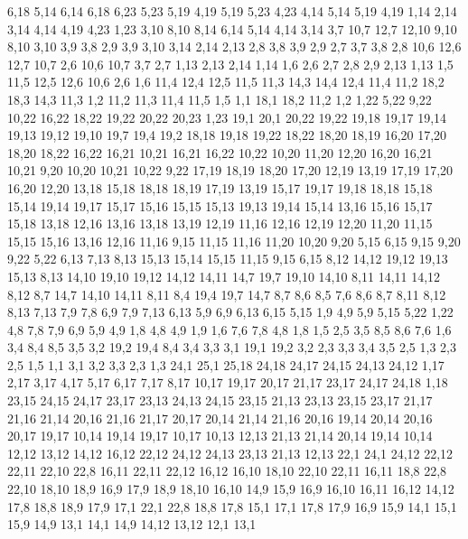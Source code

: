 6,18
%
5,14
6,14
6,18
6,23
5,23
5,19
%
4,19
5,19
5,23
4,23
%
4,14
5,14
5,19
4,19
%
1,14
2,14
3,14
4,14
4,19
4,23
1,23
%
3,10
8,10
8,14
6,14
5,14
4,14
3,14
%
3,7
10,7
12,7
12,10
9,10
8,10
3,10
3,9
3,8
%
2,9
3,9
3,10
3,14
2,14
2,13
%
2,8
3,8
3,9
2,9
%
2,7
3,7
3,8
2,8
%
10,6
12,6
12,7
10,7
%
2,6
10,6
10,7
3,7
2,7
%
1,13
2,13
2,14
1,14
%
1,6
2,6
2,7
2,8
2,9
2,13
1,13
%
1,5
11,5
12,5
12,6
10,6
2,6
1,6
%
11,4
12,4
12,5
11,5
%
11,3
14,3
14,4
12,4
11,4
%
11,2
18,2
18,3
14,3
11,3
%
1,2
11,2
11,3
11,4
11,5
1,5
%
1,1
18,1
18,2
11,2
1,2
1,22
5,22
9,22
10,22
16,22
18,22
19,22
20,22
20,23
1,23
%
19,1
20,1
20,22
19,22
19,18
19,17
19,14
19,13
19,12
19,10
19,7
19,4
19,2
%
18,18
19,18
19,22
18,22
18,20
18,19
%
16,20
17,20
18,20
18,22
16,22
16,21
%
10,21
16,21
16,22
10,22
%
10,20
11,20
12,20
16,20
16,21
10,21
%
9,20
10,20
10,21
10,22
9,22
%
17,19
18,19
18,20
17,20
%
12,19
13,19
17,19
17,20
16,20
12,20
%
13,18
15,18
18,18
18,19
17,19
13,19
%
15,17
19,17
19,18
18,18
15,18
%
15,14
19,14
19,17
15,17
15,16
15,15
%
15,13
19,13
19,14
15,14
%
13,16
15,16
15,17
15,18
13,18
%
12,16
13,16
13,18
13,19
12,19
%
11,16
12,16
12,19
12,20
11,20
%
11,15
15,15
15,16
13,16
12,16
11,16
%
9,15
11,15
11,16
11,20
10,20
9,20
%
5,15
6,15
9,15
9,20
9,22
5,22
%
6,13
7,13
8,13
15,13
15,14
15,15
11,15
9,15
6,15
%
8,12
14,12
19,12
19,13
15,13
8,13
%
14,10
19,10
19,12
14,12
14,11
%
14,7
19,7
19,10
14,10
%
8,11
14,11
14,12
8,12
%
8,7
14,7
14,10
14,11
8,11
%
8,4
19,4
19,7
14,7
8,7
8,6
8,5
%
7,6
8,6
8,7
8,11
8,12
8,13
7,13
7,9
7,8
%
6,9
7,9
7,13
6,13
%
5,9
6,9
6,13
6,15
5,15
%
1,9
4,9
5,9
5,15
5,22
1,22
%
4,8
7,8
7,9
6,9
5,9
4,9
%
1,8
4,8
4,9
1,9
%
1,6
7,6
7,8
4,8
1,8
%
1,5
2,5
3,5
8,5
8,6
7,6
1,6
%
3,4
8,4
8,5
3,5
%
3,2
19,2
19,4
8,4
3,4
3,3
%
3,1
19,1
19,2
3,2
%
2,3
3,3
3,4
3,5
2,5
%
1,3
2,3
2,5
1,5
%
1,1
3,1
3,2
3,3
2,3
1,3
24,1
25,1
25,18
24,18
24,17
24,15
24,13
24,12
%
1,17
2,17
3,17
4,17
5,17
6,17
7,17
8,17
10,17
19,17
20,17
21,17
23,17
24,17
24,18
1,18
%
23,15
24,15
24,17
23,17
%
23,13
24,13
24,15
23,15
%
21,13
23,13
23,15
23,17
21,17
21,16
21,14
%
20,16
21,16
21,17
20,17
%
20,14
21,14
21,16
20,16
%
19,14
20,14
20,16
20,17
19,17
%
10,14
19,14
19,17
10,17
%
10,13
12,13
21,13
21,14
20,14
19,14
10,14
%
12,12
13,12
14,12
16,12
22,12
24,12
24,13
23,13
21,13
12,13
%
22,1
24,1
24,12
22,12
22,11
22,10
22,8
%
16,11
22,11
22,12
16,12
%
16,10
18,10
22,10
22,11
16,11
%
18,8
22,8
22,10
18,10
18,9
%
16,9
17,9
18,9
18,10
16,10
%
14,9
15,9
16,9
16,10
16,11
16,12
14,12
%
17,8
18,8
18,9
17,9
%
17,1
22,1
22,8
18,8
17,8
%
15,1
17,1
17,8
17,9
16,9
15,9
%
14,1
15,1
15,9
14,9
%
13,1
14,1
14,9
14,12
13,12
%
12,1
13,1
